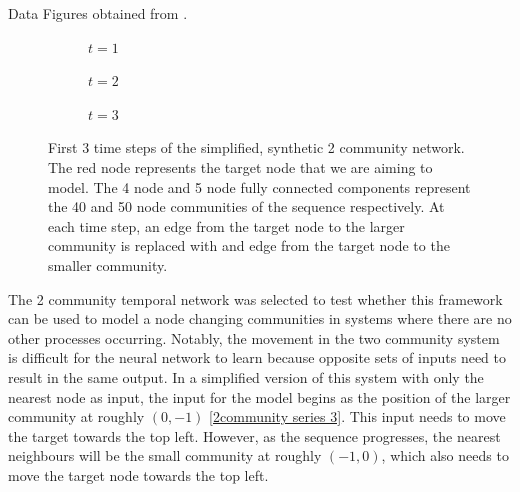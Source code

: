 \documentclass[12pt]{amsart}
\begin{document}
\begin{section}{Data}
        Figures obtained from \cite{Emma2023}.
        \begin{figure}[H]
            \centering
            \centering
            \begin{subfigure}[c]{0.3\textwidth}
                \centering
                \resizebox{.6\width}{!}{}
                \caption{$t=1$}
                \label{2community train series, a}
            \end{subfigure}
            \hfill
            \centering
            \begin{subfigure}[c]{0.3\textwidth}
                \centering
                \resizebox{.6\width}{!}{}
                \caption{$t=2$}
                \label{2community train series, b}
            \end{subfigure}
            \hfill
            \centering
            \begin{subfigure}[c]{0.3\textwidth}
                \centering
                \resizebox{.6\width}{!}{}
                \caption{$t=3$}
                \label{2community train series, c}
            \end{subfigure}
            \caption{First 3 time steps of the simplified, synthetic 2 community network. The red node represents the target node that we are aiming to model. The 4 node and 5 node fully connected components represent the 40 and 50 node communities of the sequence respectively. At each time step, an edge from the target node to the larger community is replaced with and edge from the target node to the smaller community.}
            \label{2community train series}
        \end{figure}
        The 2 community temporal network was selected to test whether this framework can be used to model a node changing communities in systems where there are no other processes occurring. Notably, the movement in the two community system is difficult for the neural network to learn because opposite sets of inputs need to result in the same output. In a simplified version of this system with only the nearest node as input, the input for the model begins as the position of the larger community at roughly $(0,-1)$ \autoref{2community series 3}. This input needs to move the target towards the top left. However, as the sequence progresses, the nearest neighbours will be the small community at roughly $(-1,0)$, which also needs to move the target node towards the top left. 


\end{section}
\end{document}
